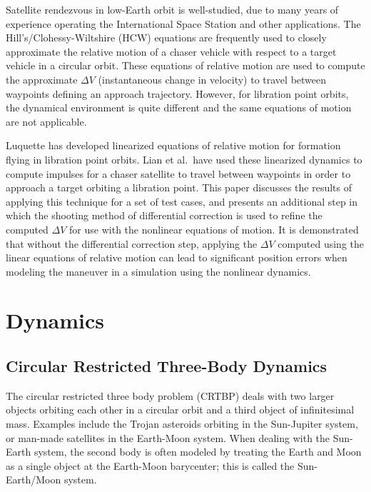 \documentclass[letterpaper, preprint, paper,11pt]{AAS}	%
\begin{document}
Satellite rendezvous in low-Earth orbit is well-studied, due to many years of experience operating the International Space Station and other applications.  The Hill's/Clohessy-Wiltshire (HCW) equations are frequently used to closely approximate the relative motion of a chaser vehicle with respect to a target vehicle in a circular orbit.\cite{clohessy1960}  These equations of relative motion are used to compute the approximate \(\Delta V\) (instantaneous change in velocity) to travel between waypoints defining an approach trajectory.  However, for libration point orbits, the dynamical environment is quite different and the same equations of motion are not applicable.  %

Luquette has developed linearized equations of relative motion for formation flying in libration point orbits.\cite{luquette2004}   Lian et al.~have used these linearized dynamics to compute impulses for a chaser satellite to travel between waypoints in order to approach a target orbiting a libration point.\cite{lian2011}  This paper discusses the results of applying this technique for a set of test cases, and presents an additional step in which the shooting method of differential correction is used to refine the computed \(\Delta V\) for use with the nonlinear equations of motion. It is demonstrated that without the differential correction step, applying the \(\Delta V\) computed using the linear equations of relative motion can lead to significant position errors when modeling the maneuver in a simulation using the nonlinear dynamics.

\section{Dynamics}

\subsection{Circular Restricted Three-Body Dynamics}
The circular restricted three body problem (CRTBP) deals with two larger objects orbiting each other in a circular orbit and a third object of infinitesimal mass.  Examples include the Trojan asteroids orbiting in the Sun-Jupiter system, or man-made satellites in the Earth-Moon system.  When dealing with the Sun-Earth system, the second body is often modeled by treating the Earth and Moon as a single object at the Earth-Moon barycenter; this is called the Sun-Earth/Moon system.
\end{document}
